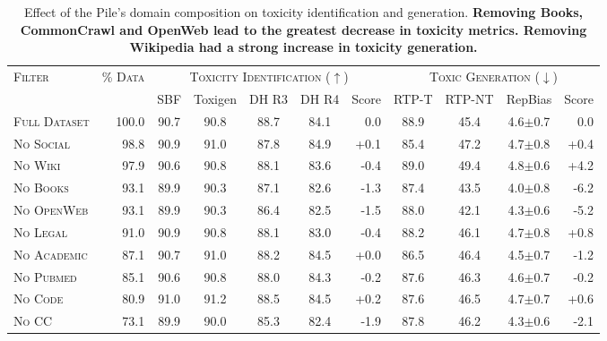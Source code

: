 
\begingroup
\setlength{\tabcolsep}{4pt}
\begin{table*}[t]
    \centering
    \small
    \caption{
    Effect of the Pile's domain composition on toxicity identification and generation.
    \textbf{Removing Books, CommonCrawl and OpenWeb lead to the greatest decrease in toxicity metrics. Removing Wikipedia had a strong increase in toxicity generation.}
    }
    \begin{tabular}{l | r | cccc | r || ccc | r}
    \toprule
    \textsc{Filter} & \textsc{\% Data} & \multicolumn{5}{c||}{\textsc{Toxicity Identification ($\uparrow$)}} & \multicolumn{4}{c}{\textsc{Toxic Generation ($\downarrow$)}} \\
    & & SBF & Toxigen & DH R3 & DH R4 & Score & RTP-T & RTP-NT & RepBias & Score \\
    \midrule

    \textsc{Full Dataset} & 100.0 & 90.7 & 90.8 & 88.7 & 84.1 & 0.0 & 88.9 & 45.4 & 4.6$\pm$0.7 & 0.0 \\
    \textsc{No Social} & 98.8 & 90.9 & 91.0 & 87.8 & 84.9 & \cellcolor{forestgreen!1}+0.1 & 85.4 & 47.2 & 4.7$\pm$0.8 & \cellcolor{forestgreen!4}+0.4 \\
    \textsc{No Wiki} & 97.9 & 90.6 & 90.8 & 88.1 & 83.6 & \cellcolor{color3!4}-0.4 & 89.0 & 49.4 & 4.8$\pm$0.6 & \cellcolor{forestgreen!42}+4.2 \\
    \textsc{No Books} & 93.1 & 89.9 & 90.3 & 87.1 & 82.6 & \cellcolor{color3!13}-1.3 & 87.4 & 43.5 & 4.0$\pm$0.8 & \cellcolor{color3!62}-6.2 \\
    \textsc{No OpenWeb} & 93.1 & 89.9 & 90.3 & 86.4 & 82.5 & \cellcolor{color3!15}-1.5 & 88.0 & 42.1 & 4.3$\pm$0.6 & \cellcolor{color3!52}-5.2 \\
    \textsc{No Legal} & 91.0 & 90.9 & 90.8 & 88.1 & 83.0 & \cellcolor{color3!4}-0.4 & 88.2 & 46.1 & 4.7$\pm$0.8 & \cellcolor{forestgreen!8}+0.8 \\
    \textsc{No Academic} & 87.1 & 90.7 & 91.0 & 88.2 & 84.5 & \cellcolor{forestgreen!.5}+0.0 & 86.5 & 46.4 & 4.5$\pm$0.7 & \cellcolor{color3!12}-1.2 \\
    \textsc{No Pubmed} & 85.1 & 90.6 & 90.8 & 88.0 & 84.3 & \cellcolor{color3!2}-0.2 & 87.6 & 46.3 & 4.6$\pm$0.7 & \cellcolor{color3!2}-0.2 \\
    \textsc{No Code} & 80.9 & 91.0 & 91.2 & 88.5 & 84.5 & \cellcolor{forestgreen!2}+0.2 & 87.6 & 46.5 & 4.7$\pm$0.7 & \cellcolor{forestgreen!6}+0.6 \\
    \textsc{No CC} & 73.1 & 89.9 & 90.0 & 85.3 & 82.4 & \cellcolor{color3!19}-1.9 & 87.8 & 46.2 & 4.3$\pm$0.6 & \cellcolor{color3!21}-2.1 \\
    
    \bottomrule
    \end{tabular}
    \label{tab:interaction-domain-tox-results}
\end{table*}
\endgroup

